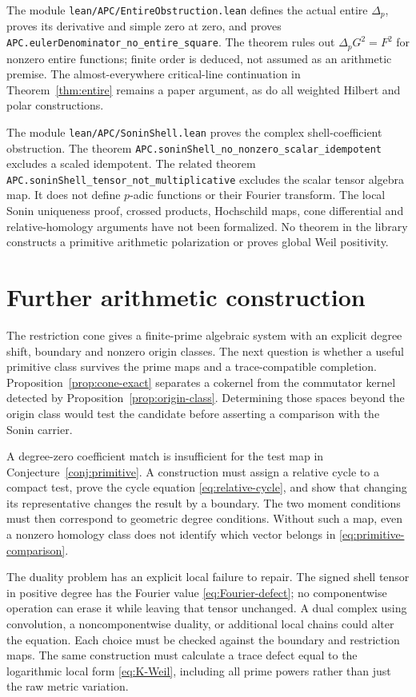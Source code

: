 \documentclass[11pt,letterpaper]{article}
\theoremstyle{definition}
\theoremstyle{remark}
\begin{document}
The module \nolinkurl{lean/APC/EntireObstruction.lean}
defines the actual entire $\Delta_p$, proves its derivative
and simple zero at zero, and proves
\nolinkurl{APC.eulerDenominator_no_entire_square}.
The theorem rules out $\Delta_pG^2=F^2$ for nonzero entire
functions; finite order is deduced, not assumed as an
arithmetic premise. The almost-everywhere critical-line
continuation in Theorem~\ref{thm:entire} remains a paper
argument, as do all weighted Hilbert and polar constructions.

The module \nolinkurl{lean/APC/SoninShell.lean} proves the
complex shell-coefficient obstruction. The theorem
\nolinkurl{APC.soninShell_no_nonzero_scalar_idempotent}
excludes a scaled idempotent. The related theorem
\nolinkurl{APC.soninShell_tensor_not_multiplicative}
excludes the scalar tensor algebra map.
It does not define $p$-adic functions or their Fourier
transform. The local Sonin uniqueness proof, crossed products,
Hochschild maps, cone differential and relative-homology
arguments have not been formalized. No theorem in the library
constructs a primitive arithmetic polarization or proves
global Weil positivity.

\section{Further arithmetic construction}

The restriction cone gives a finite-prime algebraic system with
an explicit degree shift, boundary and nonzero origin classes.
The next question is whether a useful primitive class survives
the prime maps and a trace-compatible completion.
Proposition~\ref{prop:cone-exact} separates a cokernel from the
commutator kernel detected by Proposition~\ref{prop:origin-class}.
Determining those spaces beyond the origin class would test the
candidate before asserting a comparison with the Sonin carrier.

A degree-zero coefficient match is insufficient for the test
map in Conjecture~\ref{conj:primitive}. A construction must
assign a relative cycle to a compact test, prove the cycle
equation \eqref{eq:relative-cycle}, and show that changing its
representative changes the result by a boundary. The two
moment conditions must then correspond to geometric degree
conditions. Without such a map, even a nonzero homology class
does not identify which vector belongs in
\eqref{eq:primitive-comparison}.

The duality problem has an explicit local failure to repair.
The signed shell tensor in positive degree has the Fourier
value \eqref{eq:Fourier-defect}; no componentwise operation
can erase it while leaving that tensor unchanged. A dual
complex using convolution, a noncomponentwise duality, or
additional local chains could alter the equation. Each choice
must be checked against the boundary and restriction maps.
The same construction must calculate a trace defect equal to
the logarithmic local form \eqref{eq:K-Weil}, including all
prime powers rather than just the raw metric variation.
\end{document}
